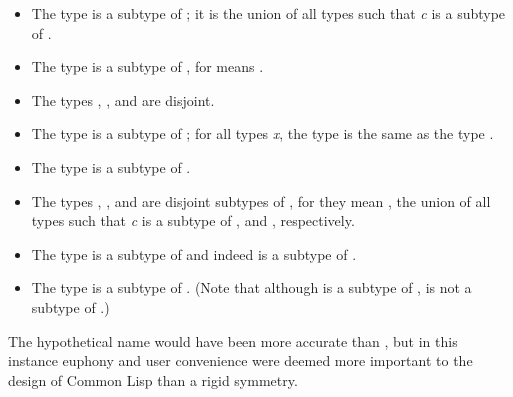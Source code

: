 \begin{itemize}
\item
The type  is a subtype of ; it is the union of
all types  such that \emph{c} is a subtype of .
\end{itemize}

\begin{itemize}
\item
The type  is a subtype of , for 
means .

\item
The types , , and  are disjoint.

\item
The type  is a subtype of ; for all types \emph{x},
the type  is the same as the type .

\item
The type  is a subtype of .
\end{itemize}

\begin{itemize}
\item
The types , , and
 are disjoint subtypes of , for they
mean , the union of all types
 such that \emph{c} is a subtype of ,
and , respectively.
\end{itemize}

\begin{itemize}
\item
The type  is a subtype of  and indeed
is a subtype of .

\item
The type  is a subtype of .
(Note that although  is a subtype of ,
 is not a subtype of .)
\end{itemize}

\beforenoterule
\begin{rationale}
The hypothetical name  would have been more accurate than
, but in this instance euphony and
user convenience were deemed more important to the design
of Common Lisp than a rigid symmetry.
\end{rationale}
\afternoterule


